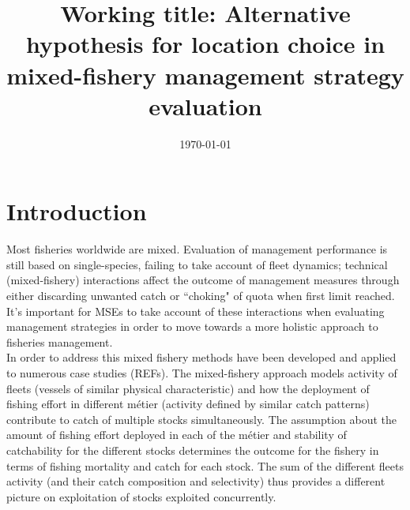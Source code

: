 \documentclass[12pt, halfline, a4paper]{ouparticle}
\begin{document}
\title{Working title: Alternative hypothesis for location choice in
	mixed-fishery management strategy evaluation}

\author{
	\address{GMIT}
	\address{CEFAS}
	\and
	\address{GMIT}
	\and
	\address{AZTI}
}


\date{\today}


\maketitle

\section{Introduction}
\label{intro}

Most fisheries worldwide are mixed. Evaluation of management performance is
still based on single-species, failing to take account of fleet dynamics;
technical (mixed-fishery) interactions affect the outcome of management
measures through either discarding unwanted catch or ``choking" of quota when
first limit reached. It's important for MSEs to take account of these
interactions when evaluating management strategies in order to move towards a
more holistic approach to fisheries management.  \\

In order to address this mixed fishery methods have been developed and applied
to numerous case studies (REFs). The mixed-fishery approach models activity of
fleets (vessels of similar physical characteristic) and how the deployment of
fishing effort in different métier (activity defined by similar catch patterns)
contribute to catch of multiple stocks simultaneously. The assumption about the
amount of fishing effort deployed in each of the métier and stability of
catchability for the different stocks determines the outcome for the fishery in
terms of fishing mortality and catch for each stock. The sum of the different
fleets activity (and their catch composition and selectivity) thus provides a
different picture on exploitation of stocks exploited concurrently. \\ 
\end{document}
